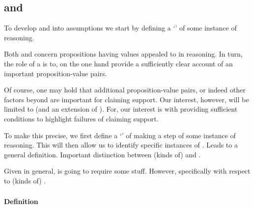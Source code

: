 \subsection{ and }
\label{sec:claim-supp-requ}

\begin{note}
  To develop \ideaCSA{} and \ideaCSB{} into assumptions we start by defining a `\requ{}' of some instance of reasoning.

  Both \ideaCSA{} and \ideaCSB{} concern propositions having values appealed to in reasoning.
  In turn, the role of a \requ{} is to, on the one hand provide a sufficiently clear account of an important proposition-value pairs.

  Of course, one may hold that additional proposition-value pairs, or indeed other factors beyond  are important for claiming support.
  Our interest, however, will be limited to  (and an extension of ).
  For, our interest is with providing sufficient conditions to highlight failures of claiming support.
\end{note}



\begin{note}
  To make this precise, we first define a `\result{}' of making a step of some instance of reasoning.
  This will then allow us to identify specific instances of .
  Leads to a general definition.
  Important distinction between (kinds of)  and .

  Given \requ{} in general, \ideaCSB{} is going to require some stuff.
  However, specifically with respect to (kinds of) .
\end{note}

\subsubsection{}
\label{sec:def-of-result}

\paragraph{Definition}

